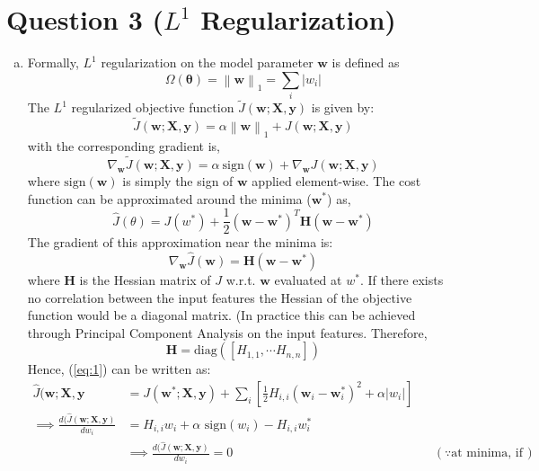 \documentclass[fleqn]{article}
\newcommand{\norm}[1]{\left\lVert#1\right\rVert} %
\begin{document}
\section*{Question 3 ($L^1$ Regularization)}
\begin{enumerate}[a)]
	\item
	Formally, $L^1$ regularization on the model parameter $\textbf{w}$ is defined as
	\begin{equation*}
		\Omega(\bm{\theta}) = \norm{\textbf{w}}_1 = \sum_{i} | w_i |
	\end{equation*}
	The $L^1$ regularized objective function $\tilde{J}(\bm{w; X, y})$ is given by:
	\begin{equation*}
		\tilde{J}(\bm{w; X, y}) = \alpha \norm{\bm{w}}_1 + J(\bm{w; X, y})
	\end{equation*}
	with the corresponding gradient is,
	\begin{equation*}
		\nabla_{\bm{w}} \tilde{J}(\bm{w; X, y}) = \alpha ~ \text{sign}(\bm{w}) + \nabla_{\bm{w}} J(\bm{w; X, y})
	\end{equation*}
	where $\text{sign}(\bm{w})$ is simply the sign of $\bm{w}$ applied element-wise. The cost function can be approximated around the minima ($\bm{w^*}$) as,
	\begin{equation} \label{eq:1}
		\hat{J}(\theta) = J(w^*) + \frac{1}{2} (\bm{w - w^*})^T \bm{H} (\bm{w - w^*})
	\end{equation}
	The gradient of this approximation near the minima is:
	\begin{equation*}
		\nabla_{\bm{w}} \hat{J}(\bm{w}) = \bm{H} (\bm{w} - \bm{w^*})
	\end{equation*}
	where $\bm{H}$ is the Hessian matrix of $J$ w.r.t. $\bm{w}$ evaluated at $w^*$.
	If there exists no correlation between the input features the Hessian of the objective function would be a diagonal matrix. (In practice this can be achieved through Principal Component Analysis on the input features. Therefore,
	$$\bm{H} = \text{diag}([H_{1, 1}, \cdots H_{n, n}])$$
	Hence, (\ref{eq:1}) can be written as:
	\begin{align*}
	\hat{J}(\bm{w; X, y} &= J(\bm{w^*; X, y}) + \sum_i \left[ \frac{1}{2} H_{i, i} (\bm{w}_i  - \bm{w}_i^*)^2 + \alpha |w_i| \right]\\
	\implies \frac{d (\hat{J}(\bm{w; X, y})}{d w_i}  &= H_{i, i} w_i + \alpha \text{ sign}(w_i) - H_{i, i} w_i^*\\
	&\implies \frac{d (\hat{J}(\bm{w; X, y})}{d w_i} = 0 && (\because \text{at minima, if possible})\\

\end{align*}
\end{enumerate}
\end{document}
